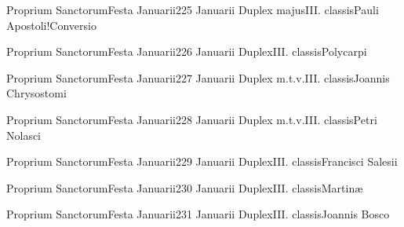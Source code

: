 \documentclass[nocturnale-romanum.tex]{subfiles}
\begin{document}
	{Proprium Sanctorum}{Festa Januarii}{2}{25 Januarii}
	{Duplex majus}{III. classis}{Pauli Apostoli!Conversio}
	{}
	{}

	{Proprium Sanctorum}{Festa Januarii}{2}{26 Januarii}
	{Duplex}{III. classis}{Polycarpi}
	{}
	{}

	{Proprium Sanctorum}{Festa Januarii}{2}{27 Januarii}
	{Duplex m.t.v.}{III. classis}{Joannis Chrysostomi}
	{}
	{}

	{Proprium Sanctorum}{Festa Januarii}{2}{28 Januarii}
	{Duplex m.t.v.}{III. classis}{Petri Nolasci}
	{}
	{}

	{Proprium Sanctorum}{Festa Januarii}{2}{29 Januarii}
	{Duplex}{III. classis}{Francisci Salesii}
	{}
	{}

	{Proprium Sanctorum}{Festa Januarii}{2}{30 Januarii}
	{Duplex}{III. classis}{Martinæ}
	{}
	{}

	{Proprium Sanctorum}{Festa Januarii}{2}{31 Januarii}
	{Duplex}{III. classis}{Joannis Bosco}
	{}
	{}
\end{document}
